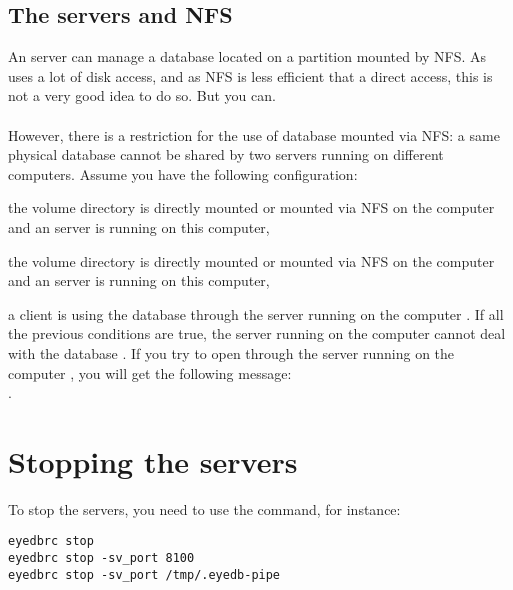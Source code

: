 \subsection{The servers and NFS}
An \eyedb server can manage a database located on a partition mounted by NFS.
As \eyedb uses a lot of disk access, and as NFS is less efficient that
a direct access, this is not a very good idea to do so. But you can.
\\
\\
However, there is a restriction for the use of database mounted via NFS:
a same physical database cannot be shared by two servers running on
different computers. Assume you have the following configuration:
\be
\item the \eyedb volume directory  is directly mounted or mounted via NFS
on the computer  and an \eyedb server is running on this computer,
\item the \eyedb volume directory  is directly mounted or mounted via NFS
on the computer  and an \eyedb server is running on this computer,
\item a client is using the database  through the
\eyedb server running on the computer .
\ee
If all the previous conditions are true, the server running on
the computer  cannot deal with the database .
If you try to open  through the server running on the
computer , you will get the following message:\\
.

\section{Stopping the servers}
To stop the \eyedb servers, you need to use the 
command, for instance:
{\verbsize\begin{verbatim}
eyedbrc stop
eyedbrc stop -sv_port 8100
eyedbrc stop -sv_port /tmp/.eyedb-pipe
\end{verbatim}}
